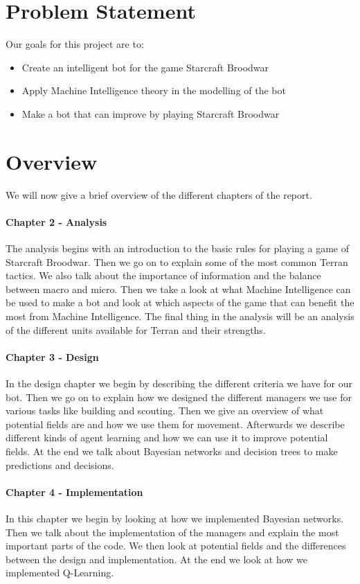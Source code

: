 \section{Problem Statement}
	Our goals for this project are to:
	\begin{itemize}
		\item Create an intelligent bot for the game Starcraft Broodwar
		\item Apply Machine Intelligence theory in the modelling of the bot
		\item Make a bot that can improve by playing Starcraft Broodwar
	\end{itemize}

\section{Overview}
	We will now give a brief overview of the different chapters of the report.

\paragraph*{Chapter 2 - Analysis}
The analysis begins with an introduction to the basic rules for playing a game of Starcraft Broodwar. Then we go on to explain some of the most common Terran tactics. We also talk about the importance of information and the balance between macro and micro. Then we take a look at what Machine Intelligence can be used to make a bot and look at which aspects of the game that can benefit the most from Machine Intelligence. The final thing in the analysis will be an analysis of the different units available for Terran and their strengths.

\paragraph*{Chapter 3 - Design}
In the design chapter we begin by describing the different criteria we have for our bot. Then we go on to explain how we designed the different managers we use for various tasks like building and scouting. Then we give an overview of what potential fields are and how we use them for movement. Afterwards we describe different kinds of agent learning and how we can use it to improve potential fields. At the end we talk about Bayesian networks and decision trees to make predictions and decisions.

\paragraph*{Chapter 4 - Implementation}
In this chapter we begin by looking at how we implemented Bayesian networks. Then we talk about the implementation of the managers and explain the most important parts of the code. We then look at potential fields and the differences between the design and implementation. At the end we look at how we implemented Q-Learning.

